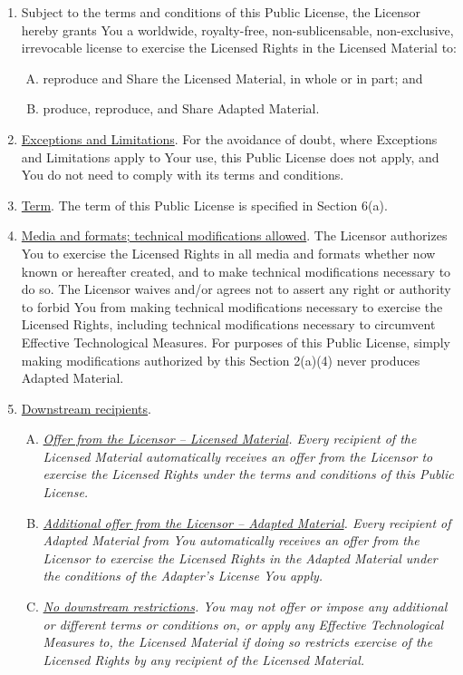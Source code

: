 {\begin{enumerate}[a.]
\begin{enumerate}[1.]
\item Subject to the terms and conditions of this Public License, the Licensor hereby grants You a worldwide, royalty-free, non-sublicensable, non-exclusive, irrevocable license to exercise the Licensed Rights in the Licensed Material to:
\begin{enumerate}[A.]
\item reproduce and Share the Licensed Material, in whole or in part; and
\item produce, reproduce, and Share Adapted Material.
\end{enumerate}
\item \underline{Exceptions and Limitations}. For the avoidance of doubt, where Exceptions and Limitations apply to Your use, this Public License does not apply, and You do not need to comply with its terms and conditions.
\item \underline{Term}. The term of this Public License is specified in Section 6(a).
\item \underline{Media and formats; technical modifications allowed}. The Licensor authorizes You to exercise the Licensed Rights in all media and formats whether now known or hereafter created, and to make technical modifications necessary to do so. The Licensor waives and/or agrees not to assert any right or authority to forbid You from making technical modifications necessary to exercise the Licensed Rights, including technical modifications necessary to circumvent Effective Technological Measures. For purposes of this Public License, simply making modifications authorized by this Section 2(a)(4) never produces Adapted Material.
\item \underline{Downstream recipients}.
\begin{enumerate}[A.]
\item \textit{\underline{Offer from the Licensor -- Licensed Material}. Every recipient of the Licensed Material automatically receives an offer from the Licensor to exercise the Licensed Rights under the terms and conditions of this Public License.}
\item \textit{\underline{Additional offer from the Licensor -- Adapted Material}. Every recipient of Adapted Material from You automatically receives an offer from the Licensor to exercise the Licensed Rights in the Adapted Material under the conditions of the Adapter’s License You apply.}
\item \textit{\underline{No downstream restrictions}. You may not offer or impose any additional or different terms or conditions on, or apply any Effective Technological Measures to, the Licensed Material if doing so restricts exercise of the Licensed Rights by any recipient of the Licensed Material.}

\end{enumerate}
\end{enumerate}
\end{enumerate}}
